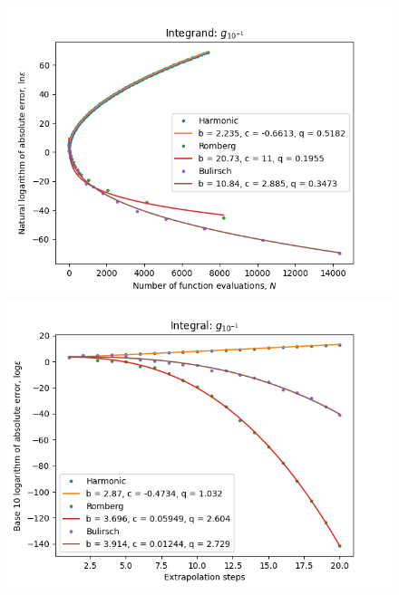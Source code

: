 \begin{figure}[H]
\centering
\begin{minipage}{0.45\textwidth}
\centering
\includegraphics[scale=0.45]{../results/romberg_plots/g_tenth_hp_trend.png}
\end{minipage}
\begin{minipage}{0.45\textwidth}
\centering
\includegraphics[scale=0.45]{../results/romberg_plots/g_tenth_hp_steps.png}
\end{minipage}
\end{figure}

